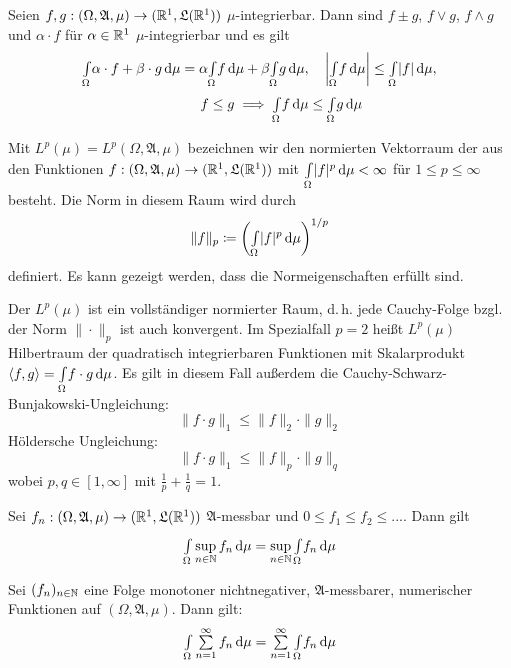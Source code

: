 \documentclass{cheat-sheet}
\newcommand{\Alg}{\mathfrak{A}}
\newcommand{\LebAlg}{\mathfrak{L}} %
\newcommand{\IntOmu}[1]{\Int{\Omega}{}{#1}{\mu}} %
\begin{document}
\begin{satz}
  Seien $f, g : (\Omega, \Alg, \mu) \to (\R^1, \LebAlg(\R^1))$ $\mu$-integrierbar. Dann sind $f \pm g$, $f \vee g$, $f \wedge g$ und $\alpha \cdot f$ für $\alpha \in \mathbb{R}^1$ $\mu$-integrierbar und es gilt
  \begin{align*}
    \IntOmu{\alpha \cdot f + \beta \cdot g} = \alpha \IntOmu{f} + \beta \IntOmu{g}, & \quad
    \left| \IntOmu{f} \right| \leq \IntOmu{|f|}, \\
    f \leq g \implies \IntOmu{f} &\leq \IntOmu{g}
  \end{align*}
\end{satz}

\begin{defn}
  Mit $L^p(\mu) = L^p(\Omega, \Alg, \mu)$ bezeichnen wir den normierten Vektorraum der aus den Funktionen $f : (\Omega, \Alg, \mu) \to (\R^1, \LebAlg(\R^1))$ mit $\IntOmu{|f|^p} < \infty$ für $1 \leq p \leq \infty$ besteht. Die Norm in diesem Raum wird durch
  \[ \|f\|_p \coloneqq \left( \IntOmu{|f|^p} \right)^{1/p} \]
  definiert. Es kann gezeigt werden, dass die Normeigenschaften erfüllt sind.
\end{defn}


\begin{bem}
  Der $L^p(\mu)$ ist ein vollständiger normierter Raum, d.\,h. jede Cauchy-Folge bzgl. der Norm $\| \cdot \|_p$ ist auch konvergent. Im Spezialfall $p = 2$ heißt $L^p(\mu)$ Hilbertraum der quadratisch integrierbaren Funktionen mit Skalarprodukt $\langle f , g \rangle = \IntOmu{f \cdot g}$. Es gilt in diesem Fall außerdem die Cauchy-Schwarz-Bunjakowski-Ungleichung:
  \[ \| f \cdot g \|_{1} \leq \|f\|_2 \cdot \|g\|_2 \]
  Höldersche Ungleichung:
  \[ \| f \cdot g \|_{1} \leq \|f\|_p \cdot \|g\|_q \]
  wobei $p, q \in [1, \infty]$ mit $\tfrac{1}{p} + \tfrac{1}{q} = 1$.
\end{bem}



\begin{satz}
  Sei $f_n : (\Omega, \Alg, \mu) \to (\R^1, \LebAlg(\R^1))$ $\Alg$-messbar und $0 \leq f_1 \leq f_2 \leq ...$. Dann gilt
  \[ \IntOmu{\sup_{n \in \N} f_n} = \sup_{n \in \N} \IntOmu{f_n} \]
\end{satz}

\begin{satz}
  Sei $(f_n)_{n \in \mathbb{N}}$ eine Folge monotoner nichtnegativer, $\Alg$-messbarer, numerischer Funktionen auf $(\Omega, \Alg, \mu)$. Dann gilt:
  \[ \IntOmu{\sum_{n=1}^{\infty} f_n} = \sum_{n=1}^\infty \IntOmu{f_n} \]
\end{satz}
\end{document}
